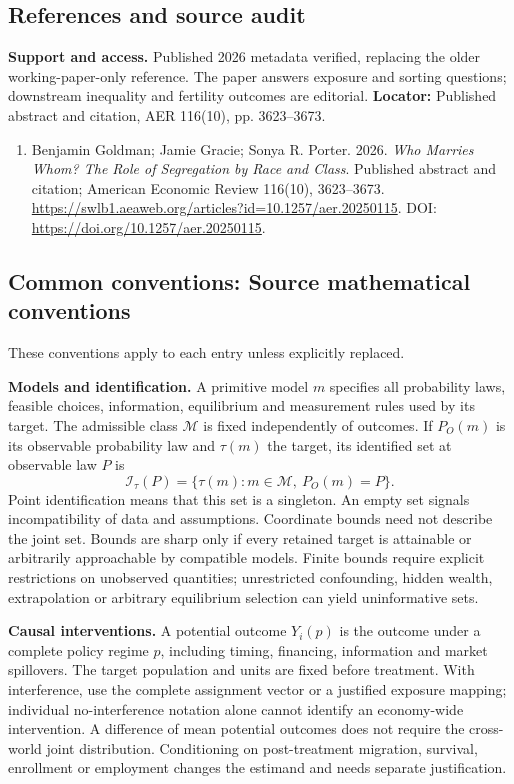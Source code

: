 \documentclass[11pt,a4paper]{article}
\begin{document}
\subsection*{References and source audit}
\textbf{Support and access.} Published 2026 metadata verified, replacing the older working-paper-only reference. The paper answers exposure and sorting questions; downstream inequality and fertility outcomes are editorial. \textbf{Locator:} Published abstract and citation, AER 116(10), pp. 3623--3673.
\begin{enumerate}\raggedright
\item\hypertarget{definitions:source:30007649:1}{} Benjamin Goldman; Jamie Gracie; Sonya R. Porter. 2026. \emph{Who Marries Whom? The Role of Segregation by Race and Class}. Published abstract and citation; American Economic Review 116(10), 3623--3673.
\url{https://swlb1.aeaweb.org/articles?id=10.1257/aer.20250115}.
DOI: \url{https://doi.org/10.1257/aer.20250115}.
\end{enumerate}

\subsection*{Common conventions: Source mathematical conventions}

These conventions apply to each entry unless explicitly replaced.

\textbf{Models and identification.} A primitive model \(m\) specifies all probability laws, feasible choices, information, equilibrium and measurement rules used by its target. The admissible class \(\mathcal M\) is fixed independently of outcomes. If \(P_O(m)\) is its observable probability law and \(\tau(m)\) the target, its identified set at observable law \(P\) is
\[
 \mathcal I_\tau(P)=\{\tau(m):m\in\mathcal M,\ P_O(m)=P\}.
\]
Point identification means that this set is a singleton. An empty set signals incompatibility of data and assumptions. Coordinate bounds need not describe the joint set. Bounds are sharp only if every retained target is attainable or arbitrarily approachable by compatible models. Finite bounds require explicit restrictions on unobserved quantities; unrestricted confounding, hidden wealth, extrapolation or arbitrary equilibrium selection can yield uninformative sets.

\textbf{Causal interventions.} A potential outcome \(Y_i(p)\) is the outcome under a complete policy regime \(p\), including timing, financing, information and market spillovers. The target population and units are fixed before treatment. With interference, use the complete assignment vector or a justified exposure mapping; individual no-interference notation alone cannot identify an economy-wide intervention. A difference of mean potential outcomes does not require the cross-world joint distribution. Conditioning on post-treatment migration, survival, enrollment or employment changes the estimand and needs separate justification.
\end{document}
